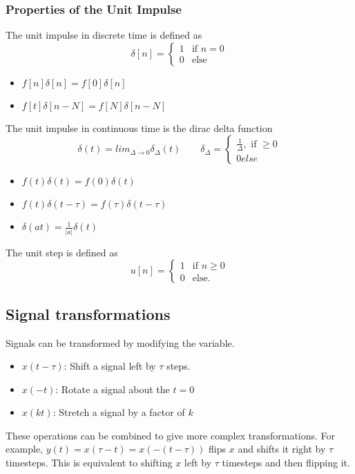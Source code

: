 \subsubsection{Properties of the Unit Impulse}
\begin{definition}
    The unit impulse in discrete time is defined as 
    \[
	  \delta[n] = \begin{cases}
		1 & \text{if } n = 0\\
		0 & \text{else }
	  \end{cases}
    \]
\end{definition}
\begin{itemize}
    \item $f[n]\delta[n] = f[0]\delta[n]$
    \item $f[t]\delta[n-N] = f[N]\delta[n-N]$
\end{itemize}
\begin{definition}
    The unit impulse in continuous time is the dirac delta function
    \[
	  \delta(t)=lim_{\Delta\rightarrow 0}\delta_{\Delta}(t) \qquad
	  \delta_{\Delta}=\begin{cases}
		  \frac{1}{\Delta},\text{ if }\ge 0 \\
		  0 else
		\end{cases}
    \]
\end{definition}
\begin{itemize}
    \item $f(t)\delta(t) = f(0)\delta(t)$
    \item $f(t)\delta(t-\tau) = f(\tau)\delta(t-\tau)$
    \item $\delta(at) = \frac{1}{|a|}\delta(t)$
\end{itemize}
\begin{definition}
    The unit step is defined as 
    \[
		u[n] = \begin{cases}
		  1 & \text{if } n \geq 0\\
		  0 & \text{else.}
	  \end{cases}
	\]
\end{definition}
\subsection{Signal transformations}
Signals can be transformed by modifying the variable.
\begin{itemize}
    \item $x(t - \tau)$: Shift a signal left by $\tau$ steps.
    \item $x(-t)$: Rotate a signal about the $t=0$
    \item $x(kt)$: Stretch a signal by a factor of $k$
\end{itemize}
These operations can be combined to give more complex transformations.
For example, $y(t) = x(\tau - t) = x(-(t-\tau))$ flips $x$ and shifts it right by $\tau$ timesteps.
This is equivalent to shifting $x$ left by $\tau$ timesteps and then flipping it.
